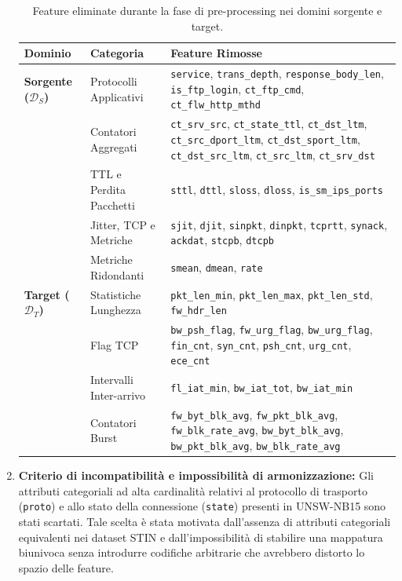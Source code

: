 \begin{enumerate}
    \begin{table}[H]
        \centering
        \small
        \caption{Feature eliminate durante la fase di pre-processing nei domini sorgente e target.}
        \label{tab:removed_features}
        \begin{tabularx}{\textwidth}{l >{\raggedright\arraybackslash}p{4cm} >{\raggedright\arraybackslash}X}
            \toprule
            \textbf{Dominio} & \textbf{Categoria} & \textbf{Feature Rimosse} \\
            \midrule
            \textbf{Sorgente ($\mathcal{D}_S$)} 
            & Protocolli Applicativi & \texttt{service}, \texttt{trans\_depth}, \texttt{response\_body\_len}, \texttt{is\_ftp\_login}, \texttt{ct\_ftp\_cmd}, \texttt{ct\_flw\_http\_mthd} \\
            & Contatori Aggregati & \texttt{ct\_srv\_src}, \texttt{ct\_state\_ttl}, \texttt{ct\_dst\_ltm}, \texttt{ct\_src\_dport\_ltm}, \texttt{ct\_dst\_sport\_ltm}, \texttt{ct\_dst\_src\_ltm}, \texttt{ct\_src\_ltm}, \texttt{ct\_srv\_dst} \\
            & TTL e Perdita Pacchetti & \texttt{sttl}, \texttt{dttl}, \texttt{sloss}, \texttt{dloss}, \texttt{is\_sm\_ips\_ports} \\
            & Jitter, TCP e Metriche & \texttt{sjit}, \texttt{djit}, \texttt{sinpkt}, \texttt{dinpkt}, \texttt{tcprtt}, \texttt{synack}, \texttt{ackdat}, \texttt{stcpb}, \texttt{dtcpb} \\
            & Metriche Ridondanti & \texttt{smean}, \texttt{dmean}, \texttt{rate} \\
            \addlinespace
            \textbf{Target ($\mathcal{D}_T$)} 
            & Statistiche Lunghezza & \texttt{pkt\_len\_min}, \texttt{pkt\_len\_max}, \texttt{pkt\_len\_std}, \texttt{fw\_hdr\_len} \\
            & Flag TCP & \texttt{bw\_psh\_flag}, \texttt{fw\_urg\_flag}, \texttt{bw\_urg\_flag}, \texttt{fin\_cnt}, \texttt{syn\_cnt}, \texttt{psh\_cnt}, \texttt{urg\_cnt}, \texttt{ece\_cnt} \\
            & Intervalli Inter-arrivo & \texttt{fl\_iat\_min}, \texttt{bw\_iat\_tot}, \texttt{bw\_iat\_min} \\
            & Contatori Burst & \texttt{fw\_byt\_blk\_avg}, \texttt{fw\_pkt\_blk\_avg}, \texttt{fw\_blk\_rate\_avg}, \texttt{bw\_byt\_blk\_avg}, \texttt{bw\_pkt\_blk\_avg}, \texttt{bw\_blk\_rate\_avg} \\
            \bottomrule
        \end{tabularx}
    \end{table}

    \item \textbf{Criterio di incompatibilità e impossibilità di armonizzazione:}
    Gli attributi categoriali ad alta cardinalità relativi al protocollo di trasporto (\texttt{proto}) e allo stato della connessione (\texttt{state}) presenti in UNSW-NB15 sono stati scartati. 
    Tale scelta è stata motivata dall'assenza di attributi categoriali equivalenti nei dataset STIN e dall'impossibilità di stabilire una mappatura biunivoca senza introdurre codifiche arbitrarie che avrebbero distorto lo spazio delle feature.
\end{enumerate}


